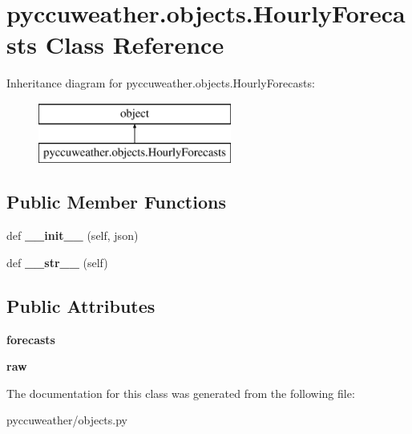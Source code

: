 \hypertarget{classpyccuweather_1_1objects_1_1_hourly_forecasts}{}\section{pyccuweather.\+objects.\+Hourly\+Forecasts Class Reference}
\label{classpyccuweather_1_1objects_1_1_hourly_forecasts}
Inheritance diagram for pyccuweather.\+objects.\+Hourly\+Forecasts\+:\begin{figure}[H]
\begin{center}
\leavevmode
\includegraphics[height=2.000000cm]{classpyccuweather_1_1objects_1_1_hourly_forecasts}
\end{center}
\end{figure}
\subsection*{Public Member Functions}
\begin{DoxyCompactItemize}
\item 
\hypertarget{classpyccuweather_1_1objects_1_1_hourly_forecasts_afae877cc383a552a49bd4dc45314b7f3}{}def {\bfseries \+\_\+\+\_\+init\+\_\+\+\_\+} (self, json)\label{classpyccuweather_1_1objects_1_1_hourly_forecasts_afae877cc383a552a49bd4dc45314b7f3}

\item 
\hypertarget{classpyccuweather_1_1objects_1_1_hourly_forecasts_a892f7098c8b4bfcdfebff293fa3a794e}{}def {\bfseries \+\_\+\+\_\+str\+\_\+\+\_\+} (self)\label{classpyccuweather_1_1objects_1_1_hourly_forecasts_a892f7098c8b4bfcdfebff293fa3a794e}

\end{DoxyCompactItemize}
\subsection*{Public Attributes}
\begin{DoxyCompactItemize}
\item 
\hypertarget{classpyccuweather_1_1objects_1_1_hourly_forecasts_aff5bd0d411a9b37e016ee4c786721c24}{}{\bfseries forecasts}\label{classpyccuweather_1_1objects_1_1_hourly_forecasts_aff5bd0d411a9b37e016ee4c786721c24}

\item 
\hypertarget{classpyccuweather_1_1objects_1_1_hourly_forecasts_ad4274d81a2ede68449839fcdc9c5cb37}{}{\bfseries raw}\label{classpyccuweather_1_1objects_1_1_hourly_forecasts_ad4274d81a2ede68449839fcdc9c5cb37}

\end{DoxyCompactItemize}


The documentation for this class was generated from the following file\+:\begin{DoxyCompactItemize}
\item 
pyccuweather/objects.\+py\end{DoxyCompactItemize}
